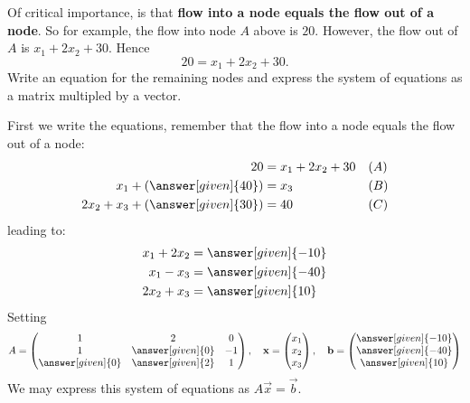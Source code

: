 \documentclass{ximera}
\begin{document}
\begin{example}
\begin{center}
\end{center}
Of critical importance, is that \textbf{flow into a node equals the
  flow out of a node}. So for example, the flow into node $A$ above is
$20$. However, the flow out of $A$ is $x_{1} + 2x_{2} + 30$. Hence
\[
20  = x_{1} + 2x_{2} + 30.
\]
Write an equation for the remaining nodes and express the system of
equations as a matrix multipled by a vector.
\begin{explanation}
  First we write the equations, remember that the flow into a node
  equals the flow out of a node:
  \begin{align*}
    20 &= x_{1} + 2x_{2} + 30 & & (A)\\
    x_{1} + \left(\answer[given]{40}\right) &= x_{3} & & (B) \\
    2x_{2} + x_{3} + \left(\answer[given]{30}\right) &= 40  & & (C)
  \end{align*}
  leading to:
  \begin{align*}
    x_{1}+2x_{2} &= \answer[given]{-10}\\
    x_{1} -x_{3}&= \answer[given]{-40}\\
    2x_{2} + x_{3}  &= \answer[given]{10}
  \end{align*}
  Setting
  \[
  A = \begin{pmatrix}
    1 & 2 & 0\\
    1 & \answer[given]{0} & -1 \\
    \answer[given]{0} & \answer[given]{2} & 1
  \end{pmatrix},
  \quad
  \vec{x} =
  \begin{pmatrix}
    x_1\\
    x_2\\
    x_3
  \end{pmatrix},
  \quad
  \vec{b} =
  \begin{pmatrix}
    \answer[given]{-10}\\
    \answer[given]{-40}\\
     \answer[given]{10}
  \end{pmatrix}
  \]
  We may express this system of equations as $A\vec{x} = \vec{b}$.
\end{explanation}
\end{example}
\end{document}
